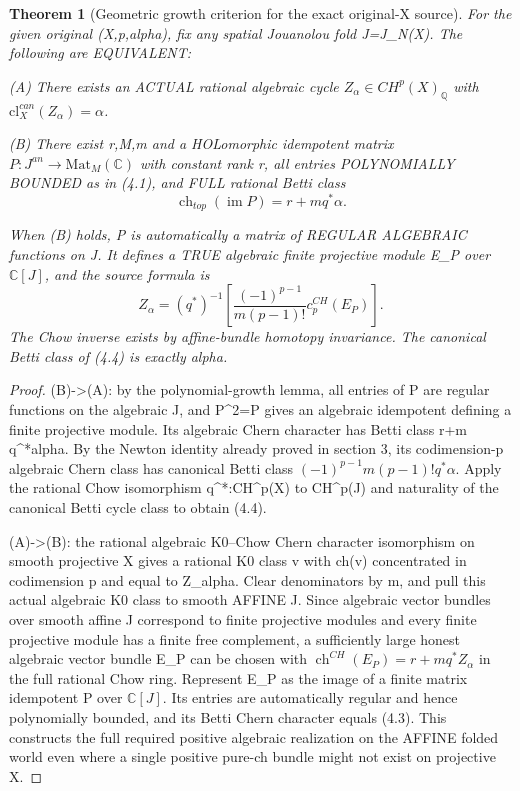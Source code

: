 \documentclass[11pt]{article}
\newtheorem{theorem}{Theorem}[section]
\begin{document}
\begin{theorem}[Geometric growth criterion for the exact original-X source]
For the given original (X,p,alpha), fix any
spatial Jouanolou fold J=J_N(X).
The following are EQUIVALENT:

(A) There exists an ACTUAL rational algebraic
cycle $Z_\alpha\in CH^p(X)_{\mathbb Q}$
with $\mathrm{cl}_X^{can}(Z_\alpha)=\alpha$.

(B) There exist r,M,m and a HOLomorphic
idempotent matrix $P:J^{an}\to
\mathrm{Mat}_M(\mathbb C)$ with constant
rank r, all entries POLYNOMIALLY BOUNDED
as in (4.1), and FULL rational Betti class
\[
  \boxed{
   \operatorname{ch}_{top}(\operatorname{im}P)
      =r+m q^*\alpha.
  }                                                       \tag{4.3}
\]

When (B) holds, P is automatically a matrix
of REGULAR ALGEBRAIC functions on J.
It defines a TRUE algebraic finite projective
module E_P over $\mathbb C[J]$,
and the source formula is
\[
 \boxed{
 Z_\alpha=(q^*)^{-1}
       \left[\frac{(-1)^{p-1}}{m(p-1)!}
                 c_p^{CH}(E_P)\right].
 }                                                       \tag{4.4}
\]
The Chow inverse exists by affine-bundle
homotopy invariance. The canonical Betti
class of (4.4) is exactly alpha.
\end{theorem}
\begin{proof}
(B)->(A): by the polynomial-growth lemma,
all entries of P are regular functions
on the algebraic J, and P^2=P gives an
algebraic idempotent defining a finite
projective module. Its algebraic Chern
character has Betti class r+m q^*alpha.
By the Newton identity already proved in
section 3, its codimension-p algebraic
Chern class has canonical Betti class
$(-1)^{p-1}m(p-1)!q^*\alpha$. Apply the
rational Chow isomorphism q^*:CH^p(X)
to CH^p(J) and naturality of the
canonical Betti cycle class to obtain
(4.4).

(A)->(B): the rational algebraic K0--Chow
Chern character isomorphism on smooth
projective X gives a rational K0 class
v with ch(v) concentrated in codimension
p and equal to Z_alpha. Clear
denominators by m, and pull this
actual algebraic K0 class to smooth
AFFINE J. Since algebraic vector
bundles over smooth affine J correspond
to finite projective modules and every
finite projective module has a finite
free complement, a sufficiently large
honest algebraic vector bundle E_P can
be chosen with
$\operatorname{ch}^{CH}(E_P)=r+m q^*Z_\alpha$
in the full rational Chow ring.
Represent E_P as the image of a finite
matrix idempotent P over $\mathbb C[J]$.
Its entries are automatically regular
and hence polynomially bounded, and its
Betti Chern character equals (4.3).
This constructs the full required
positive algebraic realization on the
AFFINE folded world even where a
single positive pure-ch bundle might
not exist on projective X.
\end{proof}
\end{document}

